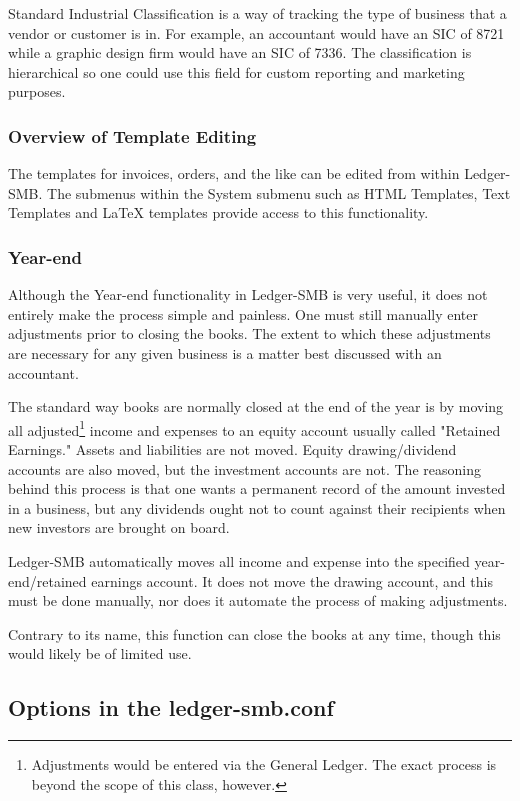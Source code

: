 \documentclass{article}
\begin{document}
Standard Industrial Classification is a way of tracking the type of business
that a vendor or customer is in.  For example, an accountant would have an SIC
of 8721 while a graphic design firm would have an SIC of 7336.  The
classification is hierarchical so one could use this field for custom reporting
and marketing purposes.

\subsubsection{Overview of Template Editing}

The templates for invoices, orders, and the like can be edited from within
Ledger-SMB.  The submenus within the System submenu such as HTML Templates,
Text Templates and LaTeX templates provide access to this functionality.

\subsubsection{Year-end}

Although the Year-end functionality in Ledger-SMB is very useful, it does not
entirely make the process simple and painless.  One must still manually enter
adjustments prior to closing the books.  The extent to which these adjustments
are necessary for any given business is a matter best discussed with an
accountant.
 
The standard way books are normally closed at the end of the year is by moving
all adjusted\footnote{Adjustments would be entered via the General Ledger.  The
exact process is beyond the scope of this class, however.} income and expenses 
to an equity account usually called "Retained
Earnings."  Assets and liabilities are not moved.  Equity drawing/dividend
accounts are also moved, but the investment accounts are not.  The reasoning
behind this process is that one wants a permanent record of the amount invested
in a business, but any dividends ought not to count against their recipients
when new investors are brought on board.

Ledger-SMB automatically moves all income and expense into the specified
year-end/retained earnings account.  It does not move the drawing account, and
this must be done manually, nor does it automate the process of making
adjustments.

Contrary to its name, this function can close the books at any time, though this
would likely be of limited use.

\subsection{Options in the ledger-smb.conf}
\end{document}
